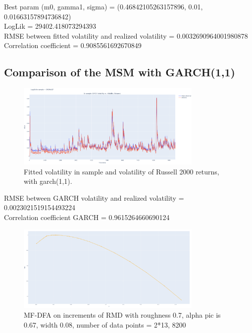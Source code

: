 \FloatBarrier

Best param (m0, gamma1, sigma) = (0.46842105263157896, 0.01, 0.01663157894736842) \\

LogLik = 29402.418073294393 \\

RMSE between fitted volatility and realized volatility = 0.0032690964001980878 \\

Correlation coefficient = 0.9085561692670849 \\



\subsection{Comparison of the MSM with GARCH(1,1)}

\begin{figure}[!ht]
    \centering
    \includegraphics[width=0.8\textwidth]{img/garch_vol}
    \caption{Fitted volatility in sample and volatility of Russell  2000 returns, with garch(1,1).}
    \label{fig:garch_fitted_vol}
\end{figure}

\FloatBarrier

RMSE between GARCH volatility and realized volatility = 0.0023021519154493224 \\

Correlation coefficient GARCH = 0.9615264660690124 \\


\begin{figure}[!ht]
    \centering
    \includegraphics[width=0.8\textwidth]{img/rmd_2_13_points}
    \caption{MF-DFA on increments of RMD with roughness 0.7, alpha pic is 0.67, width 0.08, number of data points = 2*13, 8200}
    \label{fig:rmd_2_13_points}
\end{figure}

